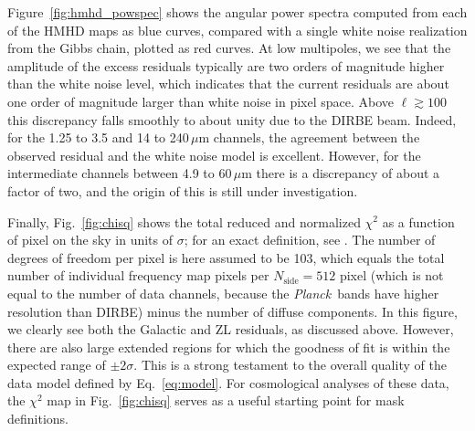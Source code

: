 \documentclass{aa}
\def\Planck{\textit{Planck}}
\begin{document}
Figure~\ref{fig:hmhd_powspec} shows the angular power spectra computed
from each of the HMHD maps as blue curves, compared with a single
white noise realization from the Gibbs chain, plotted as red curves. At low multipoles, we
see that the amplitude of the excess residuals typically are two
orders of magnitude higher than the white noise level, which indicates
that the current residuals are about one order of magnitude larger
than white noise in pixel space. Above $\ell\gtrsim100$ this
discrepancy falls smoothly to about unity due to the DIRBE
beam. Indeed, for the 1.25 to 3.5 and 14 to 240$\,\mu$m channels, the
agreement between the observed residual and the white noise model is
excellent. However, for the intermediate channels between
4.9 to 60$\,\mu$m  there is a discrepancy of about a factor of
two, and the origin of this is still under investigation.

Finally, Fig.~\ref{fig:chisq} shows the total reduced and normalized
$\chi^2$ as a function of pixel on the sky in units of $\sigma$; for
an exact definition, see \citet{bp10}. The number of degrees of
freedom per pixel is here assumed to be 103, which equals the total
number of individual frequency map pixels per $N_{\mathrm{side}}=512$
pixel (which is not equal to the number of data channels, because the
\Planck\ bands have higher resolution than DIRBE) minus the number of
diffuse components. In this figure, we clearly see both the Galactic
and ZL residuals, as discussed above. However, there are also large
extended regions for which the goodness of fit is within the expected
range of $\pm2\sigma$. This is a strong testament to the overall
quality of the data model defined by Eq.~\eqref{eq:model}. For
cosmological analyses of these data, the $\chi^2$ map in
Fig.~\ref{fig:chisq} serves as a useful starting point for mask
definitions. 
\end{document}
